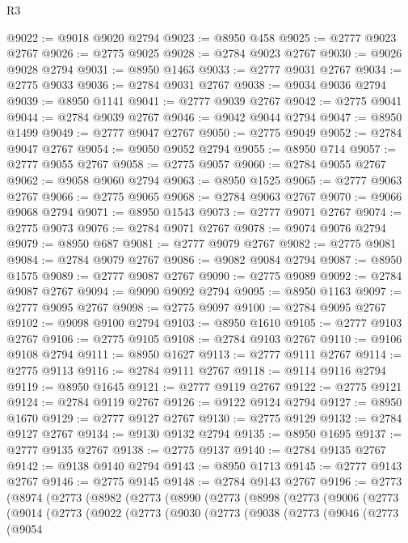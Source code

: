\begin{lexlean}{R3}
\begin{coremodule}
@9022 := @9018 @9020 @2794
@9023 := @8950 @458
@9025 := @2777 @9023 @2767
@9026 := @2775 @9025
@9028 := @2784 @9023 @2767
@9030 := @9026 @9028 @2794
@9031 := @8950 @1463
@9033 := @2777 @9031 @2767
@9034 := @2775 @9033
@9036 := @2784 @9031 @2767
@9038 := @9034 @9036 @2794
@9039 := @8950 @1141
@9041 := @2777 @9039 @2767
@9042 := @2775 @9041
@9044 := @2784 @9039 @2767
@9046 := @9042 @9044 @2794
@9047 := @8950 @1499
@9049 := @2777 @9047 @2767
@9050 := @2775 @9049
@9052 := @2784 @9047 @2767
@9054 := @9050 @9052 @2794
@9055 := @8950 @714
@9057 := @2777 @9055 @2767
@9058 := @2775 @9057
@9060 := @2784 @9055 @2767
@9062 := @9058 @9060 @2794
@9063 := @8950 @1525
@9065 := @2777 @9063 @2767
@9066 := @2775 @9065
@9068 := @2784 @9063 @2767
@9070 := @9066 @9068 @2794
@9071 := @8950 @1543
@9073 := @2777 @9071 @2767
@9074 := @2775 @9073
@9076 := @2784 @9071 @2767
@9078 := @9074 @9076 @2794
@9079 := @8950 @687
@9081 := @2777 @9079 @2767
@9082 := @2775 @9081
@9084 := @2784 @9079 @2767
@9086 := @9082 @9084 @2794
@9087 := @8950 @1575
@9089 := @2777 @9087 @2767
@9090 := @2775 @9089
@9092 := @2784 @9087 @2767
@9094 := @9090 @9092 @2794
@9095 := @8950 @1163
@9097 := @2777 @9095 @2767
@9098 := @2775 @9097
@9100 := @2784 @9095 @2767
@9102 := @9098 @9100 @2794
@9103 := @8950 @1610
@9105 := @2777 @9103 @2767
@9106 := @2775 @9105
@9108 := @2784 @9103 @2767
@9110 := @9106 @9108 @2794
@9111 := @8950 @1627
@9113 := @2777 @9111 @2767
@9114 := @2775 @9113
@9116 := @2784 @9111 @2767
@9118 := @9114 @9116 @2794
@9119 := @8950 @1645
@9121 := @2777 @9119 @2767
@9122 := @2775 @9121
@9124 := @2784 @9119 @2767
@9126 := @9122 @9124 @2794
@9127 := @8950 @1670
@9129 := @2777 @9127 @2767
@9130 := @2775 @9129
@9132 := @2784 @9127 @2767
@9134 := @9130 @9132 @2794
@9135 := @8950 @1695
@9137 := @2777 @9135 @2767
@9138 := @2775 @9137
@9140 := @2784 @9135 @2767
@9142 := @9138 @9140 @2794
@9143 := @8950 @1713
@9145 := @2777 @9143 @2767
@9146 := @2775 @9145
@9148 := @2784 @9143 @2767
@9196 := @2773
    (@8974
      (@2773
        (@8982
          (@2773
            (@8990
              (@2773
                (@8998
                  (@2773
                    (@9006
                      (@2773
                        (@9014
                          (@2773
                            (@9022
                              (@2773
                                (@9030
                                  (@2773
                                    (@9038
                                      (@2773
                                        (@9046
                                          (@2773
                                            (@9054

\end{coremodule}
\end{lexlean}
